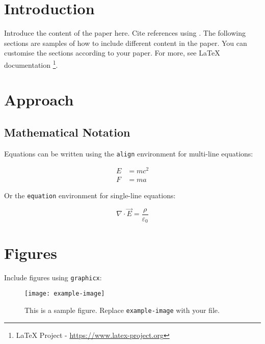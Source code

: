 \documentclass[twoside]{article}
\title{\customtitle{Your Paper Title}}
\author{
    Author One$^1$, Author Two$^2$, Author Three$^1$ \\
    {$^1$Affiliation One, $^2$Affiliation Two} \\
    \texttt{author.one@example.com, author.two@example.com, author.three@example.com}
}
\date{}
\begin{document}
\maketitle

\begin{abstract}
This is the abstract. It summarises the key contributions of the paper.
\end{abstract}


\section{Introduction}

Introduce the content of the paper here. Cite references using \cite{example}. The following sections are samples of how to include different content in the paper. You can customise the sections according to your paper. For more, see LaTeX documentation \footnote{LaTeX Project - \url{https://www.latex-project.org}}.


\section{Approach}

\subsection{Mathematical Notation}

Equations can be written using the \texttt{align} environment for multi-line equations:

\begin{align}
    E &= mc^2 \\
    F &= ma
\end{align}

Or the \texttt{equation} environment for single-line equations:

\begin{equation}
    \nabla \cdot \vec{E} = \frac{\rho}{\varepsilon_0}
\end{equation}

\section{Figures}

Include figures using \texttt{graphicx}:

\begin{figure}[ht]
    \centering
    \texttt{[image: example-image]}
    \caption{This is a sample figure. Replace \texttt{example-image} with your file.}
    \label{fig:example}
\end{figure}
\end{document}
